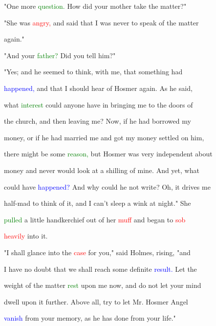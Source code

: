  "One more \textcolor{green}{question.} How did your \textcolor{BurntOrange}{mother} take the matter?"



 "She was \textcolor{red}{angry,} and said that I was never to speak of the matter

 again."



 "And your \textcolor{green}{father?} Did you tell him?"



 "Yes; and he seemed to think, with me, that something had

 \textcolor{blue}{happened,} and that I should hear of Hosmer again. As he said,

 what \textcolor{green}{interest} could anyone have in bringing me to the doors of

 the \textcolor{BurntOrange}{church,} and then \textcolor{BurntOrange}{leaving} me? Now, if he had borrowed my

 \textcolor{BurntOrange}{money,} or if he had married me and got my \textcolor{BurntOrange}{money} settled on him,

 there might be some \textcolor{green}{reason,} but Hosmer was very independent about

 \textcolor{BurntOrange}{money} and never would look at a shilling of mine. And yet, what

 could have \textcolor{blue}{happened?} And why could he not write? Oh, it drives me

 half-mad to think of it, and I can't sleep a wink at night." She

 \textcolor{green}{pulled} a little handkerchief out of her \textcolor{red}{muff} and began to \textcolor{red}{sob}

 \textcolor{red}{heavily} into it.



 "I shall glance into the \textcolor{red}{case} for you," said Holmes, rising, "and

 I have no \textcolor{BurntOrange}{doubt} that we shall reach some definite \textcolor{blue}{result.} Let the

 \textcolor{BurntOrange}{weight} of the matter \textcolor{green}{rest} upon me now, and do not let your mind

 dwell upon it further. Above all, try to let Mr. Hosmer \textcolor{BurntOrange}{Angel}

 \textcolor{blue}{vanish} from your memory, as he has done from your life."



